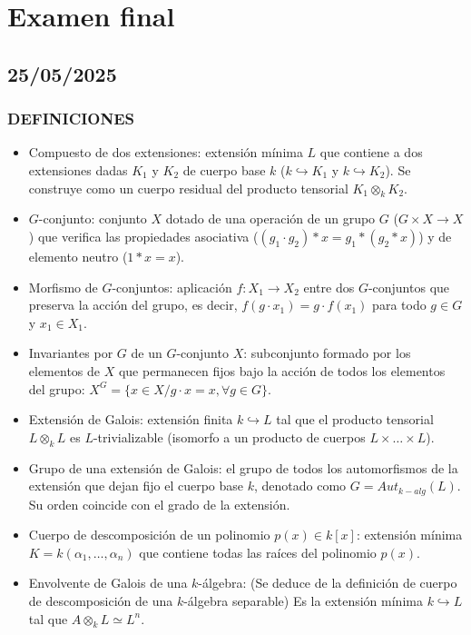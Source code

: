 
\chapter{Examen final}
\section{25/05/2025}
\subsection*{DEFINICIONES}
\begin{itemize}
    \item Compuesto de dos extensiones: extensión mínima $L$ que contiene a dos extensiones dadas $K_1$ y $K_2$ de cuerpo base $k$ ($k \hookrightarrow K_1$ y $k \hookrightarrow K_2$). Se construye como un cuerpo residual del producto tensorial $K_1 \otimes_k K_2$.
    \item $G$-conjunto: conjunto $X$ dotado de una operación de un grupo $G$ ($G \times X \rightarrow X$) que verifica las propiedades asociativa ($(g_1 \cdot g_2) * x = g_1 * (g_2 * x)$) y de elemento neutro ($1 * x = x$). 
    \item Morfismo de $G$-conjuntos: aplicación $f: X_1 \rightarrow X_2$ entre dos $G$-conjuntos que preserva la acción del grupo, es decir, $f(g \cdot x_1) = g \cdot f(x_1)$ para todo $g \in G$ y $x_1 \in X_1$.
    \item Invariantes por $G$ de un $G$-conjunto $X$: subconjunto formado por los elementos de $X$ que permanecen fijos bajo la acción de todos los elementos del grupo: $X^G = \{x \in X / g \cdot x = x, \forall g \in G\}$.
    \item Extensión de Galois: extensión finita $k \hookrightarrow L$ tal que el producto tensorial $L \otimes_k L$ es $L$-trivializable (isomorfo a un producto de cuerpos $L \times \dots \times L$).
    \item Grupo de una extensión de Galois: el grupo de todos los automorfismos de la extensión que dejan fijo el cuerpo base $k$, denotado como $G = Aut_{k-alg}(L)$. Su orden coincide con el grado de la extensión.
    \item Cuerpo de descomposición de un polinomio $p(x) \in k[x]$: extensión mínima $K = k(\alpha_1, \dots, \alpha_n)$ que contiene todas las raíces del polinomio $p(x)$. 
    \item Envolvente de Galois de una $k$-álgebra: (Se deduce de la definición de cuerpo de descomposición de una $k$-álgebra separable) Es la extensión mínima $k \hookrightarrow L$ tal que $A \otimes_k L \simeq L^n$.

\end{itemize}
